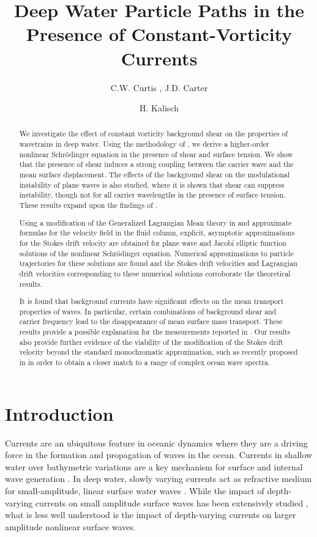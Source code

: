 \documentclass{JFM_Style/jfm}
\title{Deep Water Particle Paths in the Presence of Constant-Vorticity Currents}
\date{}
\author{C.W. Curtis \aff{1}
  \corresp{\email{ccurtis@mail.sdsu.edu}}, J.D. Carter\aff{2} \and H. Kalisch\aff{3}}
\affiliation{\aff{1}Department of Mathematics and Statistics, San Diego State University, San Diego, CA 92182
\aff{2}Mathematics Department, Seattle University, Seattle, WA 98122
\aff{3}Department of Mathematics, University of Bergen, Bergen, Norway
}
\begin{document}
\maketitle

\begin{abstract}
We investigate the effect of constant vorticity background shear on the properties of wavetrains in deep water.  Using the methodology of \cite{fokas2008}, we derive a higher-order nonlinear Schr\"{o}dinger equation in the presence of shear and surface tension.  We show that the presence of shear induces a strong coupling between the carrier wave and the mean surface displacement.  The effects of the background shear on the modulational instability of plane waves is also studied, where it is shown that shear can suppress instability, though not for all carrier wavelengths in the presence of surface tension.  These results expand upon the findings of \cite{thomas2012nonlinear}.

Using a modification of the Generalized Lagrangian Mean theory in  \cite{andrews} and approximate formulas for the velocity field in the fluid column, explicit, asymptotic approximations for the Stokes drift velocity are obtained for plane wave and Jacobi elliptic function solutions of the nonlinear Schr\"odinger equation.  Numerical approximations to particle trajectories for these solutions are found and the Stokes drift velocities and Lagrangian drift velocities corresponding to these numerical solutions corroborate the theoretical results.  

It is found that background currents have significant effects on the mean transport properties of waves. In particular, certain combinations of background shear and carrier frequency lead to the disappearance of mean surface mass transport.  These results provide a possible explanation for the measurements reported in \cite{smith}.  Our results also provide further evidence of the viability of the modification of the Stokes drift velocity beyond the standard monochromatic approximation, such as recently proposed in \cite{breivik} in order to obtain a closer match to a range of complex ocean wave spectra.
\end{abstract}

\section{Introduction}

Currents are an ubiquitous feature in oceanic dynamics where they are a driving force in the formation and propagation of waves in the ocean.  Currents in shallow water over bathymetric variations are a key mechanism for surface and internal wave generation \cite{helfrich}.  In deep water, slowly varying currents act as refractive medium for small-amplitude, linear surface water waves \cite{young}.  While the impact of depth-varying currents on small amplitude surface waves has been extensively studied \cite{craik1,craik2,craik3,craik4,phillips1,phillips2}, what is less well understood is the impact of depth-varying currents on larger amplitude nonlinear surface waves. 
\end{document}
